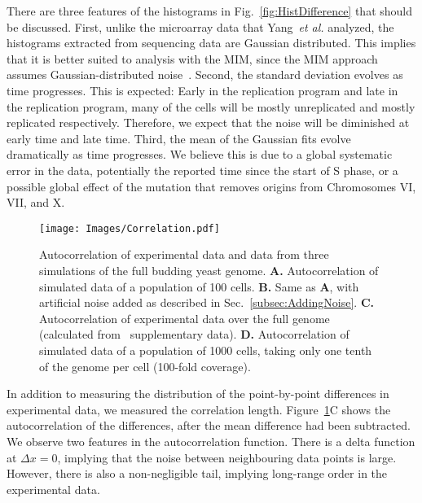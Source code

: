 		There are three features of the histograms in Fig.~\ref{fig:HistDifference} that should be discussed.
		First, unlike the microarray data that Yang~\emph{et al.} analyzed, the histograms extracted from sequencing data are Gaussian distributed.
		This implies that it is better suited to analysis with the MIM, since the MIM approach assumes Gaussian-distributed noise~\cite{ScottsPaper}.
		Second, the standard deviation evolves as time progresses.
		This is expected: Early in the replication program and late in the replication program, many of the cells will be mostly unreplicated and mostly replicated  respectively.
		Therefore, we expect that the noise will be diminished at early time and late time.
		Third, the mean of the Gaussian fits evolve dramatically as time progresses.
		We believe this is due to a global systematic error in the data, potentially the reported time since the start of S phase, or a possible global effect of the mutation that removes origins from Chromosomes VI, VII, and X.
		
		\begin{figure}[tbh]
			\begin{center}
				\texttt{[image: Images/Correlation.pdf]}
			\end{center}
				\caption[Autocorrelation of Experiment and Simulations]{\label{fig:correlation}
					Autocorrelation of experimental data and data from three simulations of the full budding yeast genome.
					\textbf{A.} Autocorrelation of simulated data of a population of 100 cells.
					\textbf{B.} Same as \textbf{A}, with artificial noise added as described in Sec.~\ref{subsec:AddingNoise}.
					\textbf{C.} Autocorrelation of experimental data  over the full genome (calculated from~\cite{StochasticTermination} supplementary data).
					\textbf{D.} Autocorrelation of simulated data of a population of 1000 cells, taking only one tenth of the genome per cell (100-fold coverage).
				}
		\end{figure}
		
		In addition to measuring the distribution of the point-by-point differences in experimental data, we measured the correlation length.
		Figure~\ref{fig:correlation}C shows the autocorrelation of the differences, after the mean difference had been subtracted.
		We observe two features in the autocorrelation function.
		There is a delta function at $\Delta x=0$, implying that the noise between neighbouring data points is large.
		However, there is also a non-negligible tail, implying long-range order in the experimental data.
		
